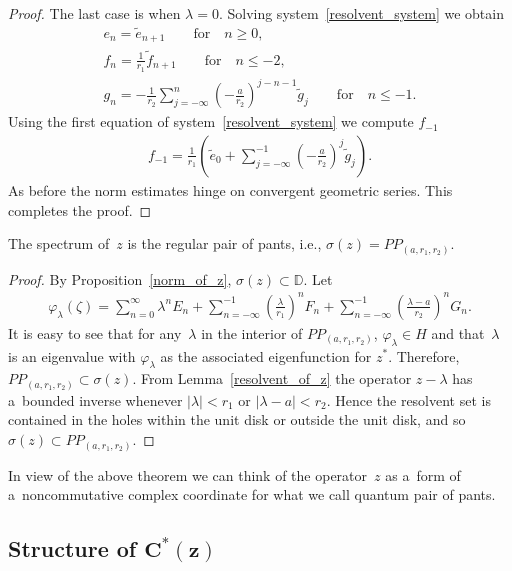 \begin{proof}
The last case is when $\lambda=0$.
Solving system~\eqref{resolvent_system} we obtain
\begin{gather*}
e_n =\tilde{e}_{n+1} \qquad\text{for}\quad n\ge0,
\\
f_n =\frac{1}{r_1}\tilde{f}_{n+1} \qquad\text{for}\quad n\le-2,
\\
g_n =-\frac{1}{r_2}\sum\limits_{j=-\infty}^n\left(-\frac{a}{r_2}\right)^{j-n-1}\tilde{g}_j \qquad\text{for}\quad n\le-1.
\end{gather*}
Using the f\/irst equation of system~\eqref{resolvent_system} we compute $f_{-1}$
\begin{gather*}
f_{-1}=\frac{1}{r_1}\left(\tilde{e}_0+\sum\limits_{j=-\infty}^{-1}\left(-\frac{a}{r_2}\right)^j\tilde{g}_j\right).
\end{gather*}
As before the norm estimates hinge on convergent geometric series.
This completes the proof.
\end{proof}

\begin{Theorem}%
The spectrum of~$z$ is the regular pair of pants, i.e., $\sigma(z)=PP_{(a, r_1,r_2)}$.
\end{Theorem}

\begin{proof}
By Proposition~\ref{norm_of_z}, $\sigma(z)\subset {\mathbb D}$.
Let
\begin{gather*}
\varphi_\lambda(\zeta)=\sum\limits_{n=0}^\infty \lambda^nE_n+\sum\limits_{n=-\infty}^{-1}
\left(\frac{\lambda}{r_1}\right)^nF_n+\sum\limits_{n=-\infty}^{-1}\left(\frac{\lambda-a}{r_2}\right)^nG_n.
\end{gather*}
It is easy to see that for any~$\lambda$ in the interior of $PP_{(a, r_1,r_2)}$, $\varphi_\lambda\in H$ and
that~$\lambda$ is an eigenvalue with $\varphi_\lambda$ as the associated eigenfunction for $z^*$.
Therefore, $PP_{(a, r_1,r_2)}\subset\sigma(z)$.
From Lemma~\ref{resolvent_of_z} the operator $z-\lambda$ has a~bounded inverse whenever $|\lambda|< r_1$ or $|\lambda-a|<r_2$.
Hence the resolvent set is contained in the holes within the unit disk or outside the unit disk, and so
$\sigma(z)\subset PP_{(a, r_1,r_2)}$.
\end{proof}

In view of the above theorem we can think of the operator~$z$ as a~form of a~noncommutative complex coordinate for what
we call quantum pair of pants.

\subsection[Structure of $C^*(z)$]{Structure of $\boldsymbol{C^*(z)}$}

